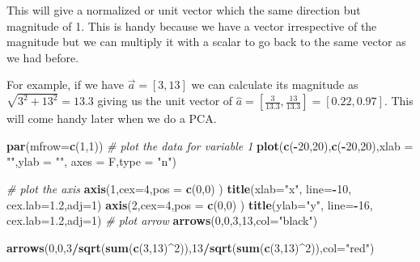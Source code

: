 \documentclass[
]{book}
\newenvironment{Shaded}{\begin{snugshade}}{\end{snugshade}}
\newcommand{\CommentTok}[1]{\textcolor[rgb]{0.56,0.35,0.01}{\textit{#1}}}
\newcommand{\DataTypeTok}[1]{\textcolor[rgb]{0.13,0.29,0.53}{#1}}
\newcommand{\DecValTok}[1]{\textcolor[rgb]{0.00,0.00,0.81}{#1}}
\newcommand{\FloatTok}[1]{\textcolor[rgb]{0.00,0.00,0.81}{#1}}
\newcommand{\KeywordTok}[1]{\textcolor[rgb]{0.13,0.29,0.53}{\textbf{#1}}}
\newcommand{\NormalTok}[1]{#1}
\newcommand{\OperatorTok}[1]{\textcolor[rgb]{0.81,0.36,0.00}{\textbf{#1}}}
\newcommand{\StringTok}[1]{\textcolor[rgb]{0.31,0.60,0.02}{#1}}
\theoremstyle{definition}
\theoremstyle{definition}
\theoremstyle{definition}
\theoremstyle{remark}
\begin{document}
This will give a normalized or unit vector which the same direction but magnitude of 1. This is handy because we have a vector irrespective of the magnitude but we can multiply it with a scalar to go back to the same vector as we had before.

For example, if we have \(\vec{a}=[3,13]\) we can calculate its magnitude as \(\sqrt{3^2+13^2}=13.3\) giving us the unit vector of \(\hat{a}=[\frac{3}{13.3},\frac{13}{13.3}]=[0.22,0.97]\). This will come handy later when we do a PCA.

\begin{Shaded}
\begin{Highlighting}[]
\KeywordTok{par}\NormalTok{(}\DataTypeTok{mfrow=}\KeywordTok{c}\NormalTok{(}\DecValTok{1}\NormalTok{,}\DecValTok{1}\NormalTok{))}
\CommentTok{# plot the data for variable 1}
\KeywordTok{plot}\NormalTok{(}\KeywordTok{c}\NormalTok{(}\OperatorTok{-}\DecValTok{20}\NormalTok{,}\DecValTok{20}\NormalTok{),}\KeywordTok{c}\NormalTok{(}\OperatorTok{-}\DecValTok{20}\NormalTok{,}\DecValTok{20}\NormalTok{),}\DataTypeTok{xlab =} \StringTok{""}\NormalTok{,}\DataTypeTok{ylab =} \StringTok{""}\NormalTok{,}
 \DataTypeTok{axes =}\NormalTok{ F,}\DataTypeTok{type =} \StringTok{"n"}\NormalTok{)}

\CommentTok{# plot the axis}
\KeywordTok{axis}\NormalTok{(}\DecValTok{1}\NormalTok{,}\DataTypeTok{cex=}\DecValTok{4}\NormalTok{,}\DataTypeTok{pos =} \KeywordTok{c}\NormalTok{(}\DecValTok{0}\NormalTok{,}\DecValTok{0}\NormalTok{) )}
\KeywordTok{title}\NormalTok{(}\DataTypeTok{xlab=}\StringTok{"x"}\NormalTok{, }\DataTypeTok{line=}\OperatorTok{-}\DecValTok{10}\NormalTok{, }\DataTypeTok{cex.lab=}\FloatTok{1.2}\NormalTok{,}\DataTypeTok{adj=}\DecValTok{1}\NormalTok{)}
\KeywordTok{axis}\NormalTok{(}\DecValTok{2}\NormalTok{,}\DataTypeTok{cex=}\DecValTok{4}\NormalTok{,}\DataTypeTok{pos =} \KeywordTok{c}\NormalTok{(}\DecValTok{0}\NormalTok{,}\DecValTok{0}\NormalTok{) )}
\KeywordTok{title}\NormalTok{(}\DataTypeTok{ylab=}\StringTok{"y"}\NormalTok{, }\DataTypeTok{line=}\OperatorTok{-}\DecValTok{16}\NormalTok{, }\DataTypeTok{cex.lab=}\FloatTok{1.2}\NormalTok{,}\DataTypeTok{adj=}\DecValTok{1}\NormalTok{)}
\CommentTok{# plot arrow }
\KeywordTok{arrows}\NormalTok{(}\DecValTok{0}\NormalTok{,}\DecValTok{0}\NormalTok{,}\DecValTok{3}\NormalTok{,}\DecValTok{13}\NormalTok{,}\DataTypeTok{col=}\StringTok{"black"}\NormalTok{)}

\KeywordTok{arrows}\NormalTok{(}\DecValTok{0}\NormalTok{,}\DecValTok{0}\NormalTok{,}\DecValTok{3}\OperatorTok{/}\KeywordTok{sqrt}\NormalTok{(}\KeywordTok{sum}\NormalTok{(}\KeywordTok{c}\NormalTok{(}\DecValTok{3}\NormalTok{,}\DecValTok{13}\NormalTok{)}\OperatorTok{^}\DecValTok{2}\NormalTok{)),}\DecValTok{13}\OperatorTok{/}\KeywordTok{sqrt}\NormalTok{(}\KeywordTok{sum}\NormalTok{(}\KeywordTok{c}\NormalTok{(}\DecValTok{3}\NormalTok{,}\DecValTok{13}\NormalTok{)}\OperatorTok{^}\DecValTok{2}\NormalTok{)),}\DataTypeTok{col=}\StringTok{"red"}\NormalTok{)}
\end{Highlighting}
\end{Shaded}
\end{document}
